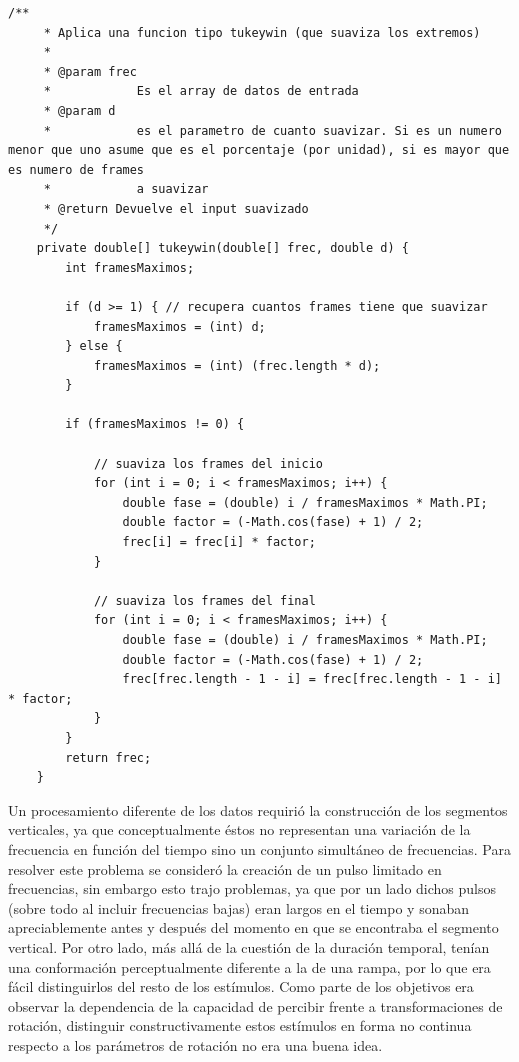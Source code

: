 \documentclass{article}
\numberwithin{figure}{section}
\begin{document}
	
	\begin{minipage}{\textwidth}
    \begin{lstlisting}[caption=Código que aplica el filtro tipo Tukey (ver figura \ref{fig:tukey}) para evitar la inclusión de armónicos por el efecto de los contornos., label=code:tukey]
     /**
	 * Aplica una funcion tipo tukeywin (que suaviza los extremos)
	 * 
	 * @param frec
	 *            Es el array de datos de entrada
	 * @param d
	 *            es el parametro de cuanto suavizar. Si es un numero menor que uno asume que es el porcentaje (por unidad), si es mayor que es numero de frames
	 *            a suavizar
	 * @return Devuelve el input suavizado
	 */
	private double[] tukeywin(double[] frec, double d) {
		int framesMaximos;

		if (d >= 1) { // recupera cuantos frames tiene que suavizar
			framesMaximos = (int) d;
		} else {
			framesMaximos = (int) (frec.length * d);
		}

		if (framesMaximos != 0) {

			// suaviza los frames del inicio
			for (int i = 0; i < framesMaximos; i++) {
				double fase = (double) i / framesMaximos * Math.PI;
				double factor = (-Math.cos(fase) + 1) / 2;
				frec[i] = frec[i] * factor;
			}

			// suaviza los frames del final
			for (int i = 0; i < framesMaximos; i++) {
				double fase = (double) i / framesMaximos * Math.PI;
				double factor = (-Math.cos(fase) + 1) / 2;
				frec[frec.length - 1 - i] = frec[frec.length - 1 - i] * factor;
			}
		}
		return frec;
	}
	\end{lstlisting}
	\end{minipage}
    
    Un procesamiento diferente de los datos requirió la construcción de los segmentos verticales, ya que conceptualmente éstos no representan una variación de la frecuencia en función del tiempo sino un conjunto simultáneo de frecuencias. Para resolver este problema se consideró la creación de un pulso limitado en frecuencias, sin embargo esto trajo problemas, ya que por un lado dichos pulsos (sobre todo al incluir frecuencias bajas) eran largos en el tiempo y sonaban apreciablemente antes y después del momento en que se encontraba el segmento vertical. Por otro lado, más allá de la cuestión de la duración temporal, tenían una conformación perceptualmente diferente a la de una rampa, por lo que era fácil distinguirlos del resto de los estímulos. Como parte de los objetivos era observar la dependencia de la capacidad de percibir frente a transformaciones de rotación, distinguir constructivamente estos estímulos en forma no continua respecto a los parámetros de rotación no era una buena idea. 
    
\end{document}
